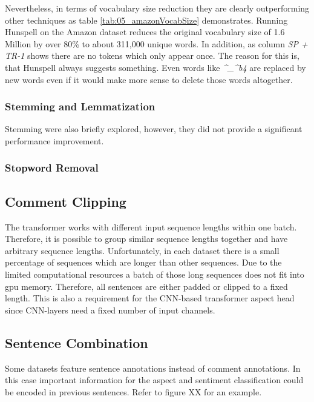 Nevertheless, in terms of vocabulary size reduction they are clearly outperforming other techniques as table \ref{tab:05_amazonVocabSize} demonstrates. Running Hunspell on the Amazon dataset reduces the original vocabulary size of 1.6 Million by over 80\% to about 311,000 unique words. In addition, as column \textit{SP + TR-1} shows there are no tokens which only appear once. The reason for this is, that Hunspell always suggests something. Even words like \textit{\^{}\_\^{}b4} are replaced by new words even if it would make more sense to delete those words altogether.


\subsubsection*{Stemming and Lemmatization}

Stemming were also briefly explored, however, they did not provide a significant performance improvement.

\subsubsection*{Stopword Removal}


\subsection{Comment Clipping}
\label{subsec:06_CommentClipping}


The transformer works with different input sequence lengths within one batch. Therefore, it is possible to group similar sequence lengths together and have arbitrary sequence lengths. Unfortunately, in each dataset there is a small percentage of sequences which are longer than other sequences. Due to the limited computational resources a batch of those long sequences  does not fit into \gls{gpu} memory. Therefore, all sentences are either padded or clipped to a fixed length. This is also a requirement for the CNN-based transformer aspect head since CNN-layers need a fixed number of input channels.

\subsection{Sentence Combination}
\label{sec:05_sentenceCombination}
Some datasets feature sentence annotations instead of comment annotations. In this case important information for the aspect and sentiment classification could be encoded in previous sentences. Refer to figure XX for an example.
\medskip

